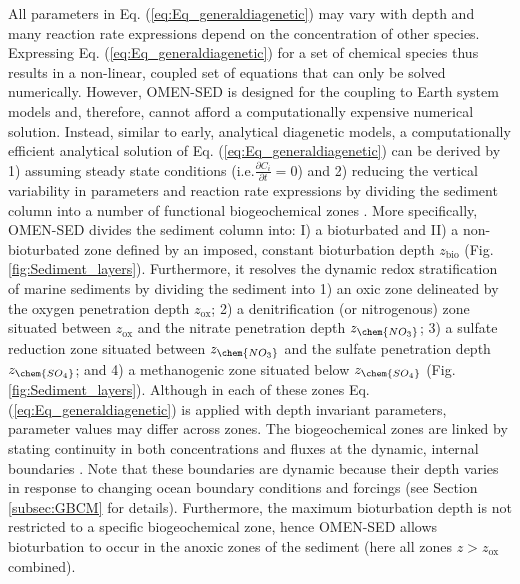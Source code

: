 \documentclass[gmd, manuscript]{copernicus}
\begin{document}
All parameters in Eq. (\ref{eq:Eq_generaldiagenetic}) may vary with depth and many reaction rate expressions depend on the concentration of other species. 
Expressing Eq. (\ref{eq:Eq_generaldiagenetic}) for a set of chemical species thus results in a non-linear, coupled set of equations that can only 
be solved numerically. 
However, OMEN-SED is designed for the coupling to Earth system models and, therefore, cannot afford a computationally expensive numerical solution. 
Instead, similar to early, analytical diagenetic models, a computationally efficient analytical solution of Eq. (\ref{eq:Eq_generaldiagenetic}) can be derived by 1) assuming steady state conditions (i.e.$ \frac{\partial C_i}{\partial t}=0$) 
and 2) reducing the vertical variability in parameters and reaction rate expressions by dividing the sediment column into a number of functional 
biogeochemical zones \citep[Fig. \ref{fig:Sediment_layers}, compare e.g. ][for similar solutions]{billen1982idealized, goloway_diagenetic_1982, ruardij_benthic_1995, tromp_global_1995, gypens_simple_2008}. 
More specifically, OMEN-SED divides the sediment column into: I) a bioturbated and 
II) a non-bioturbated zone defined by an imposed, constant bioturbation depth $z_{\mathrm{bio}}$ (Fig. \ref{fig:Sediment_layers}). Furthermore, it resolves the dynamic redox stratification of marine sediments by dividing 
the sediment into 1) an oxic zone delineated by the oxygen penetration depth $z_{\mathrm{ox}}$; 2) a denitrification (or nitrogenous) zone situated between $z_{\mathrm{ox}}$ and the nitrate penetration depth $z_{\chem{NO_3}}$;
3) a sulfate reduction zone situated between $z_{\chem{NO_3}}$ and the sulfate penetration depth $z_{\chem{SO_4}}$; and 4) a methanogenic zone situated below $z_{\chem{SO_4}}$ (Fig. \ref{fig:Sediment_layers}).  
Although in each of these zones Eq. (\ref{eq:Eq_generaldiagenetic}) is applied with depth invariant parameters, parameter values may differ across zones. 
The biogeochemical zones are linked by stating continuity in both concentrations and fluxes at the dynamic, internal boundaries 
\citep[$z_b \in \{z_{\mathrm{bio}}, z_{\mathrm{ox}}, z_{\chem{NO_3}}, z_{\chem{SO_4}} \}$, compare e.g.][]{billen1982idealized, ruardij_benthic_1995}. Note that these boundaries are dynamic because their depth varies in response to changing ocean 
boundary conditions and forcings (see Section \ref{subsec:GBCM} for details). Furthermore, the maximum bioturbation depth is not restricted to a specific biogeochemical zone, 
hence OMEN-SED allows bioturbation to occur in the anoxic zones of the sediment (here all zones $z > z_{\mathrm{ox}}$ combined). 
\end{document}
